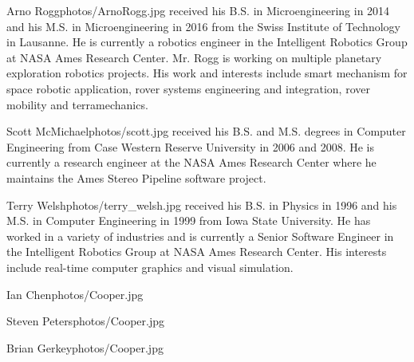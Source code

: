 \documentclass[twocolumn,letterpaper]{IEEEAerospaceCLS}  %
\begin{document}
\begin{biographywithpic}
{Arno Rogg}{photos/ArnoRogg.jpg} received his B.S. in Microengineering in 2014 and his M.S. in Microengineering in 2016 from the Swiss Institute of Technology in Lausanne. He is currently a robotics engineer in the Intelligent Robotics Group at NASA Ames Research Center. Mr. Rogg is working on multiple planetary exploration robotics projects. His work and interests include smart mechanism for space robotic application, rover systems engineering and integration, rover mobility and terramechanics.
\end{biographywithpic} 

\begin{biographywithpic}
{Scott McMichael}{photos/scott.jpg} received his B.S. 
and M.S. degrees in Computer Engineering from Case Western Reserve University in 2006 and 2008.  He is currently a research engineer at the NASA Ames Research Center where he maintains the Ames Stereo Pipeline software project.
\end{biographywithpic} 

\begin{biographywithpic}
{Terry Welsh}{photos/terry_welsh.jpg} received his B.S. in Physics in 1996 and his M.S. in Computer Engineering in 1999 from Iowa State University. He has worked in a variety of industries and is currently a Senior Software Engineer in the Intelligent Robotics Group at NASA Ames Research Center. His interests include real-time computer graphics and visual simulation.
\end{biographywithpic} 

\begin{biographywithpic}
{Ian Chen}{photos/Cooper.jpg} 





\end{biographywithpic} 

\begin{biographywithpic}
{Steven Peters}{photos/Cooper.jpg} 





\end{biographywithpic} 

\begin{biographywithpic}
{Brian Gerkey}{photos/Cooper.jpg} 





\end{biographywithpic} 
\end{document}
